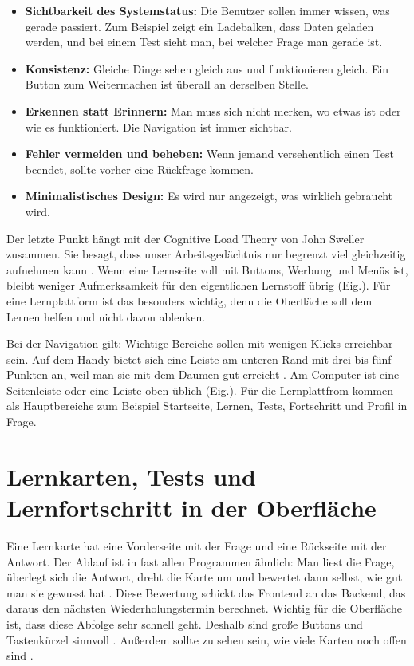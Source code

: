 \begin{itemize}
    \item \textbf{Sichtbarkeit des Systemstatus:} Die Benutzer sollen immer wissen, was gerade passiert. Zum Beispiel zeigt ein Ladebalken, dass Daten geladen werden, und bei einem Test sieht man, bei welcher Frage man gerade ist.
    \item \textbf{Konsistenz:} Gleiche Dinge sehen gleich aus und funktionieren gleich. Ein Button zum Weitermachen ist überall an derselben Stelle.
    \item \textbf{Erkennen statt Erinnern:} Man muss sich nicht merken, wo etwas ist oder wie es funktioniert. Die Navigation ist immer sichtbar.
    \item \textbf{Fehler vermeiden und beheben:} Wenn jemand versehentlich einen Test beendet, sollte vorher eine Rückfrage kommen.
    \item \textbf{Minimalistisches Design:} Es wird nur angezeigt, was wirklich gebraucht wird.
\end{itemize}
 

Der letzte Punkt hängt mit der Cognitive Load Theory von John Sweller zusammen. Sie besagt, dass unser Arbeitsgedächtnis nur begrenzt viel gleichzeitig aufnehmen kann \parencite{sweller1988}. Wenn eine Lernseite voll mit Buttons, Werbung und Menüs ist, bleibt weniger Aufmerksamkeit für den eigentlichen Lernstoff übrig (Eig.). Für eine Lernplattform ist das besonders wichtig, denn die Oberfläche soll dem Lernen helfen und nicht davon ablenken.
 
Bei der Navigation gilt: Wichtige Bereiche sollen mit wenigen Klicks erreichbar sein. Auf dem Handy bietet sich eine Leiste am unteren Rand mit drei bis fünf Punkten an, weil man sie mit dem Daumen gut erreicht \parencite{materialBottomNav}. Am Computer ist eine Seitenleiste oder eine Leiste oben üblich (Eig.). Für die Lernplattfrom kommen als Hauptbereiche zum Beispiel Startseite, Lernen, Tests, Fortschritt und Profil in Frage.
 
\section{Lernkarten, Tests und Lernfortschritt in der Oberfläche}

Eine Lernkarte hat eine Vorderseite mit der Frage und eine Rückseite mit der Antwort. Der Ablauf ist in fast allen Programmen ähnlich: Man liest die Frage, überlegt sich die Antwort, dreht die Karte um und bewertet dann selbst, wie gut man sie gewusst hat \parencite{anki2026}. Diese Bewertung schickt das Frontend an das Backend, das daraus den nächsten Wiederholungstermin berechnet. Wichtig für die Oberfläche ist, dass diese Abfolge sehr schnell geht. Deshalb sind große Buttons und Tastenkürzel sinnvoll \parencite{anki2026}. Außerdem sollte zu sehen sein, wie viele Karten noch offen sind \parencite{nielsen1994}.
 
